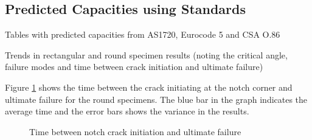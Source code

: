 \documentclass[11pt,a4paper]{article}
\numberwithin{equation}{subsection}
\begin{document}
\subsection{Predicted Capacities using Standards}

\vspace*{\baselineskip}
\noindent Tables with predicted capacities from AS1720, Eurocode 5 and CSA O.86\par


\vspace*{\baselineskip}
\noindent Trends in rectangular and round specimen results (noting the critical angle, failure modes and time between crack initiation and ultimate failure) \par

\vspace*{\baselineskip}

\noindent
Figure \ref{fig:Round-Crack-fail} shows the time between the crack initiating at the notch corner and ultimate failure for the round specimens. The blue bar in the graph indicates the average time and the error bars shows the variance in the results. 

	\begin{figure}[h]
		\begin{center}
		\end{center}
		\caption{Time between notch crack initiation and ultimate failure}
		\label{fig:Round-Crack-fail}
	\end{figure}
\end{document}

